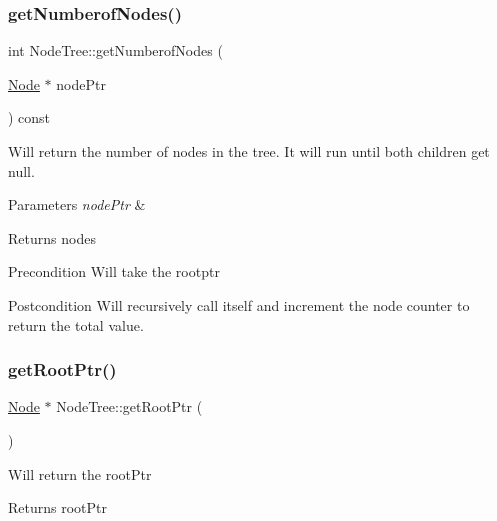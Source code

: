 \subsubsection{\texorpdfstring{get\+Numberof\+Nodes()}{getNumberofNodes()}}
{\footnotesize\ttfamily int Node\+Tree\+::get\+Numberof\+Nodes (\begin{DoxyParamCaption}\item[{\mbox{\hyperlink{class_node}{Node}} $\ast$}]{node\+Ptr }\end{DoxyParamCaption}) const}



Will return the number of nodes in the tree. It will run until both children get null. 


\begin{DoxyParams}{Parameters}
{\em node\+Ptr} & \\
\hline
\end{DoxyParams}
\begin{DoxyReturn}{Returns}
nodes 
\end{DoxyReturn}
\begin{DoxyPrecond}{Precondition}
Will take the rootptr 
\end{DoxyPrecond}
\begin{DoxyPostcond}{Postcondition}
Will recursively call itself and increment the node counter to return the total value. 
\end{DoxyPostcond}
\mbox{\label{class_node_tree_a5581b1e229d7310960e826a14e34f560}} 
\subsubsection{\texorpdfstring{get\+Root\+Ptr()}{getRootPtr()}}
{\footnotesize\ttfamily \mbox{\hyperlink{class_node}{Node}} $\ast$ Node\+Tree\+::get\+Root\+Ptr (\begin{DoxyParamCaption}{ }\end{DoxyParamCaption})}

Will return the root\+Ptr \begin{DoxyReturn}{Returns}
root\+Ptr 
\end{DoxyReturn}
\mbox{\label{class_node_tree_a504b5d012ccee99b85642d699396dd8f}} 
